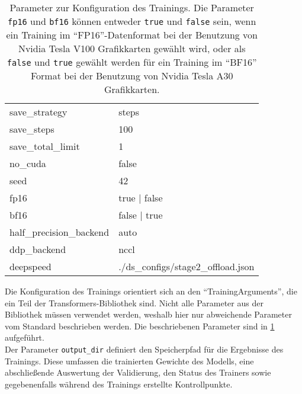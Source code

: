 \begin{table}
\begin{tabular}{ll}
        save\_strategy                  & steps                              \\
        save\_steps                     & 100                                \\
        save\_total\_limit              & 1                                  \\
        no\_cuda                        & false                              \\
        seed                            & 42                                 \\
        fp16                            & true | false                       \\
        bf16                            & false | true                       \\
        half\_precision\_backend        & auto                               \\
        ddp\_backend                    & nccl                               \\
        deepspeed                       & ./ds\_configs/stage2\_offload.json \\
        \bottomrule
    \end{tabular}
    \caption[Parameter zur Konfiguration des Trainings]{Parameter zur Konfiguration des Trainings.
        Die Parameter \texttt{fp16} und \texttt{bf16} können entweder \texttt{true} und \texttt{false} sein, wenn ein Training im \enquote{FP16}-Datenformat bei der Benutzung von Nvidia Tesla V100 Grafikkarten gewählt wird, oder als \texttt{false} und \texttt{true} gewählt werden für ein Training im \enquote{BF16} Format bei der Benutzung von Nvidia Tesla A30 Grafikkarten.}\label{tab:training-config}
\end{table}
Die Konfiguration des Trainings orientiert sich an den \enquote{TrainingArguments}, die ein Teil der Transformers-Bibliothek sind.
Nicht alle Parameter aus der Bibliothek müssen verwendet werden, weshalb hier nur abweichende Parameter vom Standard beschrieben werden.
Die beschriebenen Parameter sind in \cref{tab:training-config} aufgeführt.\\

Der Parameter \texttt{output\_dir} definiert den Speicherpfad für die Ergebnisse des Trainings.
Diese umfassen die trainierten Gewichte des Modells, eine abschließende Auswertung der Validierung, den Status des Trainers sowie gegebenenfalls während des Trainings erstellte Kontrollpunkte.\\

